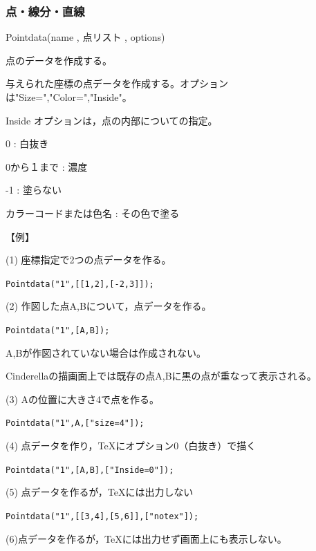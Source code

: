 \documentclass[papersize,a4paper,12pt,uplatex]{jsarticle}
\begin{document}
\subsubsection{点・線分・直線}
\begin{description}

\vspace{\baselineskip}
\hypertarget{pointdata}{}
\item[関数]Pointdata(name , 点リスト , options)
\item[機能]点のデータを作成する。
\item[説明]与えられた座標の点データを作成する。オプションは"Size=","Color=","Inside"。

Inside オプションは，点の内部についての指定。

0 : 白抜き

0から１まで : 濃度

-1 : 塗らない

カラーコードまたは色名 : その色で塗る

\vspace{\baselineskip}
【例】

(1) 座標指定で2つの点データを作る。

\hspace{10mm} \verb|Pointdata("1",[[1,2],[-2,3]]);|

(2) 作図した点A,Bについて，点データを作る。

\hspace{10mm} \verb|Pointdata("1",[A,B]);|

\hspace{5mm}A,Bが作図されていない場合は作成されない。

\hspace{5mm}Cinderellaの描画面上では既存の点A,Bに黒の点が重なって表示される。

(3) Aの位置に大きさ4で点を作る。

\hspace{10mm} \verb|Pointdata("1",A,["size=4"]);|

(4) 点データを作り，TeXにオプション0（白抜き）で描く

\hspace{10mm}\verb|Pointdata("1",[A,B],["Inside=0"]);|

(5) 点データを作るが，TeXには出力しない

\hspace{10mm}\verb|Pointdata("1",[[3,4],[5,6]],["notex"]);|

(6)点データを作るが，TeXには出力せず画面上にも表示しない。


\end{description}
\end{document}
